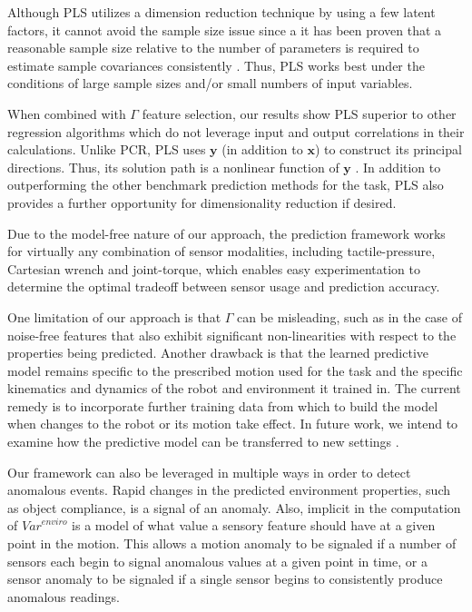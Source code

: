 Although PLS utilizes a dimension reduction technique by using a few latent factors, it cannot avoid the sample size issue since a it has been proven that a reasonable sample size relative to the number of parameters is required to estimate sample covariances consistently \cite{chun2010sparse}.
Thus, PLS works best under the conditions of large sample sizes and/or small numbers of input variables. 

When combined with $\Gamma$ feature selection, our results show PLS superior to other regression algorithms which do not leverage input and output correlations in their calculations.
Unlike PCR, PLS uses $\mathbf{y}$ (in addition to $\mathbf{x}$) to construct its principal directions.
Thus, its solution path is a nonlinear function of $\mathbf{y}$ \cite{Friedman2001}.
In addition to outperforming the other benchmark prediction methods for the task, PLS also provides a further opportunity for dimensionality reduction if desired. 

Due to the model-free nature of our approach, the prediction framework works for virtually any combination of sensor modalities, including tactile-pressure, Cartesian wrench and joint-torque, 
which enables easy experimentation to determine the optimal tradeoff between sensor usage and prediction accuracy.

One limitation of our approach is that $\Gamma$ can be misleading, such as in the case of noise-free features that also exhibit significant non-linearities with respect to the properties being predicted. 
Another drawback is that the learned predictive model remains specific to the prescribed motion used for the task and the specific kinematics and dynamics of the robot and environment it trained in.
The current remedy is to incorporate further training data from which to build the model when changes to the robot or its motion take effect.
In future work, we intend to examine how the predictive model can be transferred to new settings \cite{pan2010survey}.

Our framework can also be leveraged in multiple ways in order to detect anomalous events.
Rapid changes in the predicted environment properties, such as object compliance, is a signal of an anomaly.
Also, implicit in the computation of $\mathit{Var}^{enviro}$ is a model of what value a sensory feature should have at a given point in the motion.
This allows a motion anomaly to be signaled if a number of sensors each begin to signal anomalous values at a given point in time, or a sensor anomaly to be signaled if a single sensor begins to consistently produce anomalous readings.





